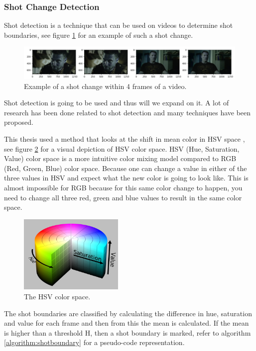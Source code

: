 \documentclass{article}
\begin{document}
\subsubsection{Shot Change Detection}

Shot detection is a technique that can be used on videos to determine shot boundaries, see figure \ref{shotchange} for an example of such a shot change. 

\begin{figure}[H]
	\includegraphics[width=12cm]{images/shotchange.jpg}
	\centering
	\caption{Example of a shot change within 4 frames of a video.}
	\label{shotchange}
\end{figure}

Shot detection is going to be used and thus will we expand on it. A lot of research has been done related to shot detection \cite{lienhart1998comparison} and many techniques have been proposed. 

This thesis used a method that looks at the shift in mean color in HSV space \cite{shao2015shot}, see figure \ref{hsvspace} for a visual depiction of HSV color space. HSV (Hue, Saturation, Value) color space is a more intuitive color mixing model compared to RGB (Red, Green, Blue) color space. Because one can change a value in either of the three values in HSV and expect what the new color is going to look like. This is almost impossible for RGB because for this same color change to happen, you need to change all three red, green and blue values to result in the same color space.

\begin{figure}[H]
	\includegraphics[width=5cm]{images/hsv.png}
	\centering
	\caption{The HSV color space.}
	\label{hsvspace}
\end{figure}

The shot boundaries are classified by calculating the difference in hue, saturation and value for each frame and then from this the mean is calculated. If the mean is higher than a threshold H, then a shot boundary is marked, refer to algorithm \ref{algorithm:shotboundary} for a pseudo-code representation.
\end{document}
